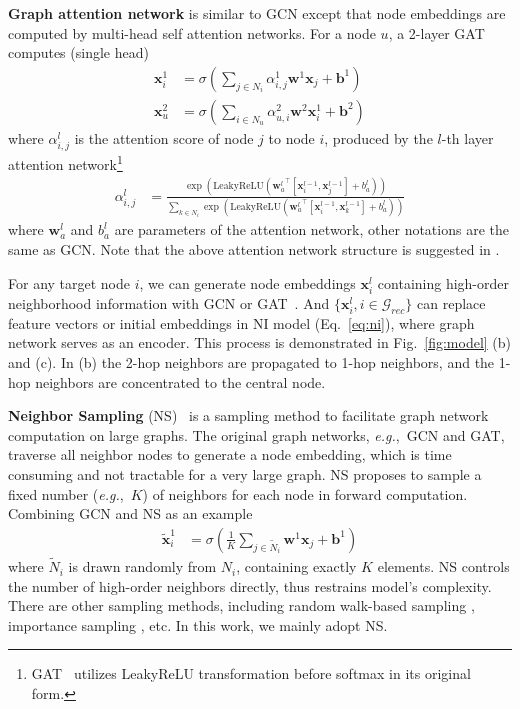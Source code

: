 \documentclass[sigconf]{acmart}
\newcommand{\mG}{\mathcal{G}}
\newcommand{\bw}{\mathbf{w}}
\newcommand{\bx}{\mathbf{x}}
\newcommand{\bb}{\mathbf{b}}
\newcommand{\eg}{\emph{e.g.},~}
\begin{document}
\textbf{Graph attention network} is similar to GCN except that node embeddings are computed by multi-head self attention networks. For a node $u$, a 2-layer GAT computes (single head)
\begin{align}
\bx_i^1 & = \sigma(\sum_{j \in N_i} \alpha^1_{i,j} {\bw^1} \bx_j + \bb^1) \\
\bx_u^2 & = \sigma(\sum_{i \in N_u} \alpha^2_{u,i} {\bw^2} \bx_i^1 + \bb^2) \label{eq:gat}
\end{align}
where $\alpha^l_{i,j}$ is the attention score of node $j$ to node $i$, produced by the $l$-th layer attention network\footnote{GAT~\cite{velickovic2017graph} utilizes LeakyReLU transformation before softmax in its original form.}
\begin{align}
\alpha^l_{i,j} & = \frac{\exp(\text{LeakyReLU}({\bw_a^l}^\top [\bx_i^{l-1}, \bx_j^{l-1}] + b_a^l))}{\sum_{k \in N_i} \exp(\text{LeakyReLU}({\bw_a^l}^\top [\bx_i^{l-1}, \bx_k^{l-1}] + b_a^l))}
\end{align}
where $\bw_a^l$ and $b_a^l$ are parameters of the attention network, other notations are the same as GCN. Note that the above attention network structure is suggested in \cite{velickovic2017graph}.

For any target node $i$, we can generate node embeddings $\bx_i^l$ containing high-order neighborhood information with GCN or GAT~\cite{kipf2016semi,velickovic2017graph}. And $\{\bx_i^l, i \in \mG_{rec}\}$ can replace feature vectors or initial embeddings in NI model (Eq.~\eqref{eq:ni}), where graph network serves as an encoder. This process is demonstrated in Fig.~\ref{fig:model} (b) and (c). In (b) the 2-hop neighbors are propagated to 1-hop neighbors, and the 1-hop neighbors are concentrated to the central node.

\textbf{Neighbor Sampling} (NS)~\cite{hamilton2017inductive} is a sampling method to facilitate graph network computation on large graphs. 
The original graph networks, \eg GCN and GAT, traverse all neighbor nodes to generate a node embedding, which is time consuming and not tractable for a very large graph. 
NS proposes to sample a fixed number (\eg $K$) of neighbors for each node in forward computation. Combining GCN and NS as an example
\begin{align}
\tilde{\bx}^1_i & = \sigma(\frac{1}{K}\sum_{j \in \tilde{N}_i} {\bw^1} \bx_j + \bb^1)
\label{eq:ns}
\end{align}
where $\tilde{N}_i$ is drawn randomly from $N_i$, containing exactly $K$ elements. NS controls the number of high-order neighbors directly, thus restrains model's complexity.
There are other sampling methods, including random walk-based sampling \cite{ying2018graph}, importance sampling \cite{chen2018fastgcn}, etc. In this work, we mainly adopt NS.
\end{document}
